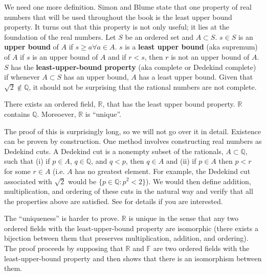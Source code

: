 We need one more definition. Simon and Blume state that one property
of real numbers that will be used throughout the book is the least
upper bound property. It turns out that this property is not only
useful; it lies at the foundation of the real numbers. Let $S$ be an
ordered set and $A \subset S$. $s \in S$ is an \textbf{upper bound} of
$A$ if $s \geq a \forall a \in A$. $s$ is a \textbf{least upper bound}
(aka supremum) of $A$ if $s$ is an upper bound of $A$ and if $r < s$,
then $r$ is not an upper bound of $A$. $S$ has the
\textbf{least-upper-bound property} (aka complete or Dedekind
complete) if whenever $A \subset S$ has an upper bound, $A$ has a
least upper bound. Given that $\sqrt{2} \not\in \mathbb{Q}$, it should
not be surprising that the rational numbers are not complete. %

\begin{theorem}
  There exists an ordered field, $\mathbb{R}$, that has the least
  upper bound property. $\mathbb{R}$ contains $\mathbb{Q}$. Moreoever,
  $\mathbb{R}$ is ``unique''.
\end{theorem}

The proof of this is surprisingly long, so we will not go over it in
detail. Existence can be proven by construction. One method involves
constructing real numbers as Dedekind cuts. A Dedekind cut is a
nonempty subset of the rationals, $A \subset \mathbb{Q}$, such that
(i) if $p \in A$, $q \in \mathbb{Q}$, and $q < p$, then $q \in A$ and
(ii) if $p \in A$ then $p<r$ for some $r \in A$ (i.e. $A$ has no
greatest element. For example, the Dedekind cut associated with
$\sqrt{2}$ would be $\{p \in \mathbb{Q}: p^2 < 2\}$). We would then
define addition, multiplication, and ordering of these cuts in the
natural way and verify that all the properties above are
satisfied. See \citet{rudin1976} for details if you are interested.

The ``uniqueness'' is harder to prove. $\mathbb{R}$ is unique in the
sense that any two ordered fields with the least-upper-bound property
are isomorphic (there exists a bijection between them that preserves
multiplication, addition, and ordering). The proof proceeds by
supposing that $\mathbb{R}$ and $\mathbb{F}$ are two ordered fields
with the least-upper-bound property and then shows that there is an
isomorphism between them.








